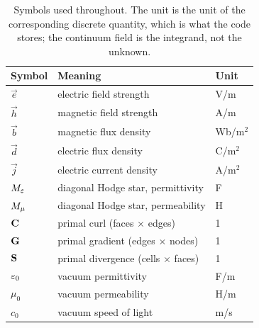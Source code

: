 \begin{table}[H]
  \centering
  \caption{Symbols used throughout. The unit is the unit of the corresponding discrete quantity, which is what
  the code stores; the continuum field is the integrand, not the unknown.}
  \label{tab:notation}
  \begin{tabular}{@{}lll@{}}
    \toprule
    Symbol & Meaning & Unit \\
    \midrule
    $\vec e$      & electric field strength            & V/m   \\
    $\vec h$      & magnetic field strength            & A/m   \\
    $\vec b$      & magnetic flux density              & Wb/m$^2$ \\
    $\vec d$      & electric flux density              & C/m$^2$ \\
    $\vec j$      & electric current density           & A/m$^2$ \\
    ${M_{\varepsilon}}$         & diagonal Hodge star, permittivity  & F     \\
    ${M_{\mu}}$         & diagonal Hodge star, permeability  & H     \\
    $\mathbf{C}$       & primal curl (faces $\times$ edges) & 1     \\
    $\mathbf{G}$       & primal gradient (edges $\times$ nodes) & 1 \\
    $\mathbf{S}$       & primal divergence (cells $\times$ faces) & 1 \\
    $\varepsilon_0$      & vacuum permittivity                & F/m   \\
    $\mu_0$       & vacuum permeability                & H/m   \\
    $c_0$         & vacuum speed of light              & m/s   \\
    \bottomrule
  \end{tabular}
\end{table}

